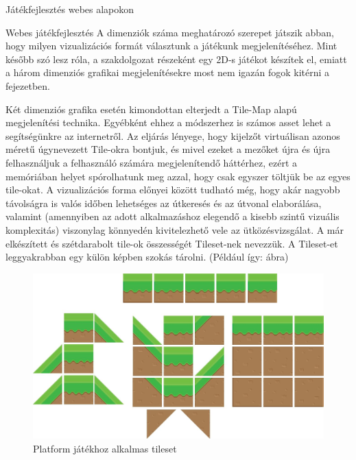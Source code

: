 \begin{MyChapter}{Játékfejlesztés webes alapokon}
\begin{MySection}{Webes játékfejlesztés}
		A dimenziók száma meghatározó szerepet játszik abban, hogy milyen vizualizációs formát választunk a játékunk megjelenítéséhez. Mint később szó lesz róla, a szakdolgozat részeként egy 2D-s játékot készítek el, emiatt a három dimenziós grafikai megjelenítésekre most nem igazán fogok kitérni a fejezetben.
		
		Két dimenziós grafika esetén kimondottan elterjedt a Tile-Map alapú megjelenítési technika. Egyébként ehhez a módszerhez is számos asset lehet a segítségünkre az internetről. Az eljárás lényege, hogy kijelzőt virtuálisan azonos méretű úgynevezett Tile-okra bontjuk, és mivel ezeket a mezőket újra és újra felhasználjuk a felhasználó számára megjelenítendő háttérhez, ezért a memóriában helyet spórolhatunk meg azzal, hogy csak egyszer töltjük be az egyes tile-okat. A vizualizációs forma előnyei között tudható még, hogy akár nagyobb távolságra is valós időben lehetséges az útkeresés és az útvonal elaborálása, valamint (amennyiben az adott alkalmazáshoz elegendő a kisebb szintű vizuális komplexitás) viszonylag könnyedén kivitelezhető vele az ütközésvizsgálat.
		A már elkészített és szétdarabolt tile-ok összességét Tileset-nek nevezzük. A Tileset-et leggyakrabban egy külön képben szokás tárolni. (Például így:  ábra)
		\begin{figure}[h!]
			\centering
			\includegraphics[scale=0.25]{kepek/tileMap/TileSet.png}
			\caption{Platform játékhoz alkalmas tileset}
			\label{fig:tileMap:tileSet}
		\end{figure}
	

\end{MySection}
\end{MyChapter}
